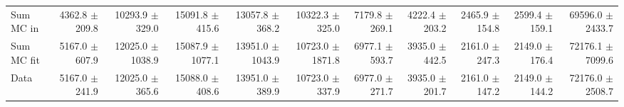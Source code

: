 \begin{table}[htbp]
{\begin{tabular}{lrrrrrrrrrr}
\hline
Sum MC in & 4362.8 $\pm$ 209.8 & 10293.9 $\pm$ 329.0 & 15091.8 $\pm$ 415.6 & 13057.8 $\pm$ 368.2 & 10322.3 $\pm$ 325.0 & 7179.8 $\pm$ 269.1 & 4222.4 $\pm$ 203.2 & 2465.9 $\pm$ 154.8 & 2599.4 $\pm$ 159.1& 69596.0 $\pm$ 2433.7 \\
Sum MC fit & 5167.0 $\pm$ 607.9 & 12025.0 $\pm$ 1038.9 & 15087.9 $\pm$ 1077.1 & 13951.0 $\pm$ 1043.9 & 10723.0 $\pm$ 1871.8 & 6977.1 $\pm$ 593.7 & 3935.0 $\pm$ 442.5 & 2161.0 $\pm$ 247.3 & 2149.0 $\pm$ 176.4 & 72176.1 $\pm$ 7099.6 \\
\hline
Data & 5167.0 $\pm$ 241.9 & 12025.0 $\pm$ 365.6 & 15088.0 $\pm$ 408.6 & 13951.0 $\pm$ 389.9 & 10723.0 $\pm$ 337.9 & 6977.0 $\pm$ 271.7 & 3935.0 $\pm$ 201.7 & 2161.0 $\pm$ 147.2 & 2149.0 $\pm$ 144.2 & 72176.0 $\pm$ 2508.7 \\
\hline
\end{tabular}
}
\end{table}
